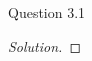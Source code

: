 \begin{solution}{Question 3.1}\label{ques:31}
    \begin{question}
    \end{question}
    \tcblower{}
    \begin{proof}[Solution]
    \end{proof}
\end{solution}
